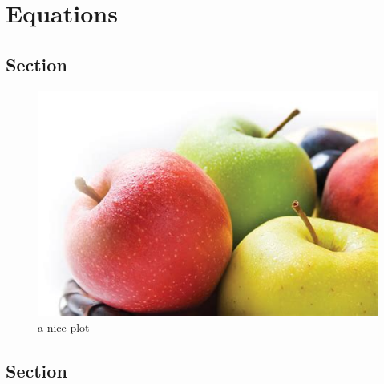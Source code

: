\chapter{Equations}

   \section{Section}

        \begin{figure}[h]
            \centering
            \includegraphics{./images/apple.jpeg}
            \caption{a nice plot}
            \label{fig:mesh1}
        \end{figure}

   \section{Section}




